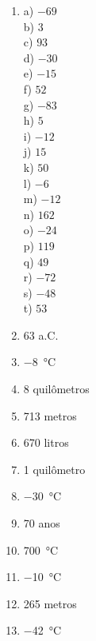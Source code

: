 \documentclass{exam}
\begin{document}
\begin{multicols*}{4}
\begin{enumerate}
\item 	a) $-69$ \\
		b) $3$ \\
		c) $93$ \\
		d) $-30$ \\
		e) $-15$ \\
		f) $52$ \\
		g) $-83$ \\
		h) $5$ \\
		i) $-12$ \\
		j) $15$ \\
		k) $50$ \\
		l) $-6$ \\
		m) $-12$ \\
		n) $162$ \\
		o) $-24$ \\
		p) $119$ \\
		q) $49$ \\
		r) $-72$ \\
		s) $-48$ \\
		t) $53$ \\

\item 63 a.C.
\item \SI{-8}{\celsius}
\item 8 quilômetros
\item 713 metros
\item 670 litros
\item 1 quilômetro
\item \SI{-30}{\celsius}
\item 70 anos
\item \SI{700}{\celsius}
\item \SI{-10}{\celsius}
\item 265 metros
\item \SI{-42}{\celsius}


\end{enumerate}

\end{multicols*}
\end{document}
